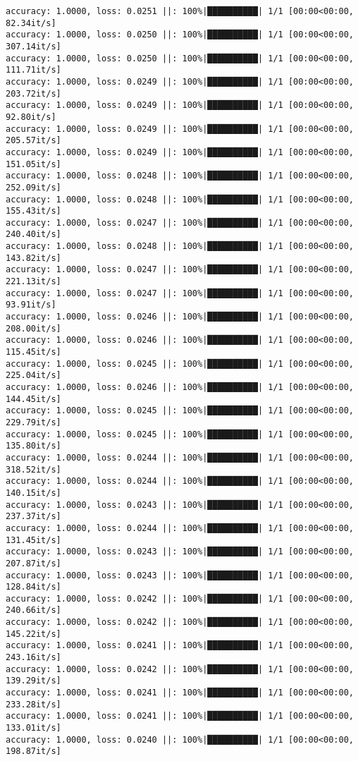 \documentclass[
]{article}
\begin{document}
\begin{verbatim}
accuracy: 1.0000, loss: 0.0251 ||: 100%|██████████| 1/1 [00:00<00:00, 82.34it/s]
accuracy: 1.0000, loss: 0.0250 ||: 100%|██████████| 1/1 [00:00<00:00, 307.14it/s]
accuracy: 1.0000, loss: 0.0250 ||: 100%|██████████| 1/1 [00:00<00:00, 111.71it/s]
accuracy: 1.0000, loss: 0.0249 ||: 100%|██████████| 1/1 [00:00<00:00, 203.72it/s]
accuracy: 1.0000, loss: 0.0249 ||: 100%|██████████| 1/1 [00:00<00:00, 92.80it/s]
accuracy: 1.0000, loss: 0.0249 ||: 100%|██████████| 1/1 [00:00<00:00, 205.57it/s]
accuracy: 1.0000, loss: 0.0249 ||: 100%|██████████| 1/1 [00:00<00:00, 151.05it/s]
accuracy: 1.0000, loss: 0.0248 ||: 100%|██████████| 1/1 [00:00<00:00, 252.09it/s]
accuracy: 1.0000, loss: 0.0248 ||: 100%|██████████| 1/1 [00:00<00:00, 155.43it/s]
accuracy: 1.0000, loss: 0.0247 ||: 100%|██████████| 1/1 [00:00<00:00, 240.40it/s]
accuracy: 1.0000, loss: 0.0248 ||: 100%|██████████| 1/1 [00:00<00:00, 143.82it/s]
accuracy: 1.0000, loss: 0.0247 ||: 100%|██████████| 1/1 [00:00<00:00, 221.13it/s]
accuracy: 1.0000, loss: 0.0247 ||: 100%|██████████| 1/1 [00:00<00:00, 93.91it/s]
accuracy: 1.0000, loss: 0.0246 ||: 100%|██████████| 1/1 [00:00<00:00, 208.00it/s]
accuracy: 1.0000, loss: 0.0246 ||: 100%|██████████| 1/1 [00:00<00:00, 115.45it/s]
accuracy: 1.0000, loss: 0.0245 ||: 100%|██████████| 1/1 [00:00<00:00, 225.04it/s]
accuracy: 1.0000, loss: 0.0246 ||: 100%|██████████| 1/1 [00:00<00:00, 144.45it/s]
accuracy: 1.0000, loss: 0.0245 ||: 100%|██████████| 1/1 [00:00<00:00, 229.79it/s]
accuracy: 1.0000, loss: 0.0245 ||: 100%|██████████| 1/1 [00:00<00:00, 135.80it/s]
accuracy: 1.0000, loss: 0.0244 ||: 100%|██████████| 1/1 [00:00<00:00, 318.52it/s]
accuracy: 1.0000, loss: 0.0244 ||: 100%|██████████| 1/1 [00:00<00:00, 140.15it/s]
accuracy: 1.0000, loss: 0.0243 ||: 100%|██████████| 1/1 [00:00<00:00, 237.37it/s]
accuracy: 1.0000, loss: 0.0244 ||: 100%|██████████| 1/1 [00:00<00:00, 131.45it/s]
accuracy: 1.0000, loss: 0.0243 ||: 100%|██████████| 1/1 [00:00<00:00, 207.87it/s]
accuracy: 1.0000, loss: 0.0243 ||: 100%|██████████| 1/1 [00:00<00:00, 128.84it/s]
accuracy: 1.0000, loss: 0.0242 ||: 100%|██████████| 1/1 [00:00<00:00, 240.66it/s]
accuracy: 1.0000, loss: 0.0242 ||: 100%|██████████| 1/1 [00:00<00:00, 145.22it/s]
accuracy: 1.0000, loss: 0.0241 ||: 100%|██████████| 1/1 [00:00<00:00, 243.16it/s]
accuracy: 1.0000, loss: 0.0242 ||: 100%|██████████| 1/1 [00:00<00:00, 139.29it/s]
accuracy: 1.0000, loss: 0.0241 ||: 100%|██████████| 1/1 [00:00<00:00, 233.28it/s]
accuracy: 1.0000, loss: 0.0241 ||: 100%|██████████| 1/1 [00:00<00:00, 133.01it/s]
accuracy: 1.0000, loss: 0.0240 ||: 100%|██████████| 1/1 [00:00<00:00, 198.87it/s]

\end{verbatim}
\end{document}
